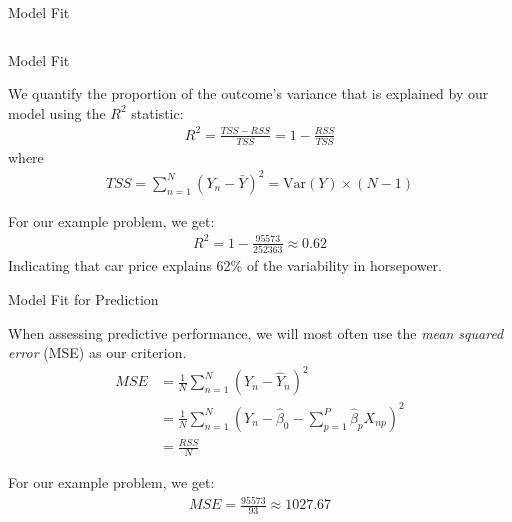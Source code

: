 \documentclass[10pt]{beamer}\usepackage[]{graphicx}\usepackage[]{color}
\newenvironment{knitrout}{}{} %
\begin{document}
\begin{frame}{Model Fit}
\begin{columns}
  \end{columns}

\end{frame}

\watermarkon %

\begin{frame}[shrink = 5]{Model Fit}

  We quantify the proportion of the outcome's variance that is explained by our
  model using the $R^2$ statistic:
  \begin{align*}
    R^2 = \frac{TSS - RSS}{TSS} = 1 - \frac{RSS}{TSS}
  \end{align*}
  where
  \begin{align*}
    TSS = \sum_{n = 1}^N \left(Y_n - \bar{Y}\right)^2 =
    \text{Var}(Y)\times (N - 1)
  \end{align*}



For our example problem, we get:
\begin{align*}
  R^2 = 1 - \frac{95573}{252363} \approx
  0.62
\end{align*}
Indicating that car price explains 62\% of the variability in
horsepower.

\end{frame}


\begin{frame}{Model Fit for Prediction}

  When assessing predictive performance, we will most often use the \emph{mean
    squared error} (MSE) as our criterion.
  \vb
  \begin{align*}
    MSE &= \frac{1}{N} \sum_{n = 1}^N \left(Y_n - \hat{Y}_n\right)^2\\
    &= \frac{1}{N} \sum_{n = 1}^N \left(Y_n - \hat{\beta}_0 -
    \sum_{p = 1}^P \hat{\beta}_p X_{np} \right)^2\\
    &= \frac{RSS}{N}
  \end{align*}



For our example problem, we get:
\begin{align*}
  MSE = \frac{95573}{93} \approx 1027.67
\end{align*}

\end{frame}
\end{document}

